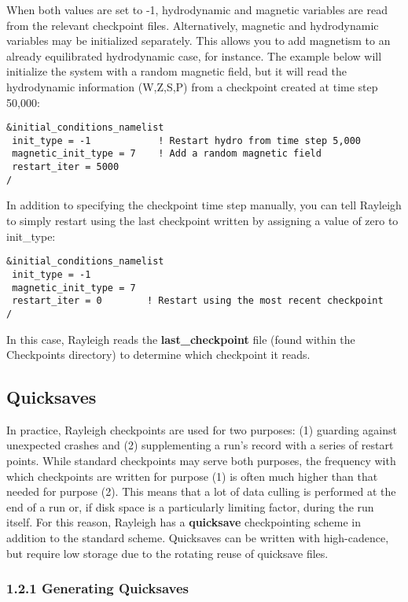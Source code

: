 When both values are set to -1, hydrodynamic and magnetic variables are read from the relevant checkpoint files.  Alternatively, magnetic and hydrodynamic variables may be initialized separately.  This allows you to add magnetism to an already equilibrated hydrodynamic case, for instance.  The example below will initialize the system with a random magnetic field, but it will read the hydrodynamic information (W,Z,S,P) from a checkpoint created at time step 50,000:
\begin{lstlisting}
&initial_conditions_namelist
 init_type = -1            ! Restart hydro from time step 5,000
 magnetic_init_type = 7    ! Add a random magnetic field
 restart_iter = 5000
/
\end{lstlisting}
In addition to specifying the checkpoint time step manually, you can tell Rayleigh to simply restart using the last checkpoint written by assigning a value of zero to init\_type:

\begin{lstlisting}
&initial_conditions_namelist
 init_type = -1
 magnetic_init_type = 7
 restart_iter = 0        ! Restart using the most recent checkpoint
/
\end{lstlisting}

In this case, Rayleigh reads the \textbf{last\_checkpoint} file (found within the Checkpoints directory) to determine which checkpoint it reads.


\subsection{Quicksaves}
In practice, Rayleigh checkpoints are used for two purposes:  (1) guarding against unexpected crashes and (2) supplementing a run's record with a series of restart points.  While standard checkpoints may serve both purposes, the frequency with which checkpoints are written for purpose (1) is often much higher than that needed for purpose (2).  This means that a lot of data culling is performed at the end of a run or, if disk space is a particularly limiting factor, during the run itself.  For this reason, Rayleigh has a \textbf{quicksave} checkpointing scheme in addition to the standard scheme.  Quicksaves can be written with high-cadence, but require low storage due to the rotating reuse of quicksave files.

\subsubsection{1.2.1 Generating Quicksaves}

